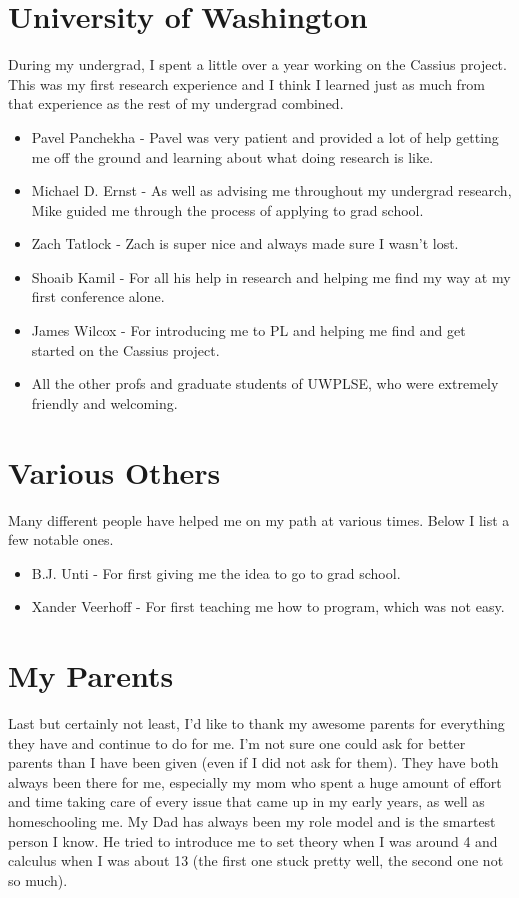 \section*{University of Washington}
During my undergrad, I spent a little over a year working on the Cassius project.
This was my first research experience and I think I learned just as much from that experience as the rest of my undergrad combined.
\begin{itemize}
    \item Pavel Panchekha - Pavel was very patient and provided a lot of help getting me off the ground and learning about what doing research is like.
    \item Michael D. Ernst - As well as advising me throughout my undergrad research, Mike guided me through the process of applying to grad school.
    \item Zach Tatlock - Zach is super nice and always made sure I wasn't lost.
    \item Shoaib Kamil - For all his help in research and helping me find my way at my first conference alone.
    \item James Wilcox - For introducing me to PL and helping me find and get started on the Cassius project.
    \item All the other profs and graduate students of UWPLSE, who were extremely friendly and welcoming.
\end{itemize}

\section*{Various Others}
Many different people have helped me on my path at various times. Below I list a few notable ones.
\begin{itemize}
    \item B.J. Unti - For first giving me the idea to go to grad school.
    \item Xander Veerhoff - For first teaching me how to program, which was not easy.
\end{itemize}

\section*{My Parents}
Last but certainly not least, I'd like to thank my awesome parents for everything they have and continue to do for me.
I'm not sure one could ask for better parents than I have been given (even if I did not ask for them).
They have both always been there for me, especially my mom who spent a huge amount of effort and time taking care of every issue that came up in my early years, as well as homeschooling me.
My Dad has always been my role model and is the smartest person I know.
He tried to introduce me to set theory when I was around 4 and calculus when I was about 13 (the first one stuck pretty well, the second one not so much).
